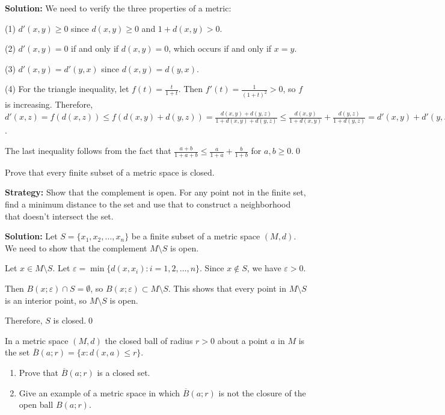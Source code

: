 \bigskip\noindent\textbf{Solution:} We need to verify the three properties of a metric:

(1) $d'(x,y) \geq 0$ since $d(x,y) \geq 0$ and $1 + d(x,y) > 0$.

(2) $d'(x,y) = 0$ if and only if $d(x,y) = 0$, which occurs if and only if $x = y$.

(3) $d'(x,y) = d'(y,x)$ since $d(x,y) = d(y,x)$.

(4) For the triangle inequality, let $f(t) = \frac{t}{1+t}$. Then $f'(t) = \frac{1}{(1+t)^2} > 0$, so $f$ is increasing. Therefore, $d'(x,z) = f(d(x,z)) \leq f(d(x,y) + d(y,z)) = \frac{d(x,y) + d(y,z)}{1 + d(x,y) + d(y,z)} \leq \frac{d(x,y)}{1 + d(x,y)} + \frac{d(y,z)}{1 + d(y,z)} = d'(x,y) + d'(y,z)$.

The last inequality follows from the fact that $\frac{a+b}{1+a+b} \leq \frac{a}{1+a} + \frac{b}{1+b}$ for $a,b \geq 0$.\qed


\begin{problembox}
Prove that every finite subset of a metric space is closed.
\end{problembox}

\noindent\textbf{Strategy:} Show that the complement is open. For any point not in the finite set, find a minimum distance to the set and use that to construct a neighborhood that doesn't intersect the set.

\bigskip\noindent\textbf{Solution:} Let $S = \{x_1, x_2, \ldots, x_n\}$ be a finite subset of a metric space $(M,d)$. We need to show that the complement $M \setminus S$ is open.

Let $x \in M \setminus S$. Let $\varepsilon = \min\{d(x,x_i) : i = 1,2,\ldots,n\}$. Since $x \notin S$, we have $\varepsilon > 0$.

Then $B(x;\varepsilon) \cap S = \emptyset$, so $B(x;\varepsilon) \subset M \setminus S$. This shows that every point in $M \setminus S$ is an interior point, so $M \setminus S$ is open.

Therefore, $S$ is closed.\qed


\begin{problembox}
In a metric space \((M, d)\) the closed ball of radius \( r > 0 \) about a point \( a \) in \( M \) is the set \( \overline{B}(a; r) = \{x : d(x, a) \leq r\} \).
\begin{enumerate}[label=\alph*)]
\item Prove that \( \overline{B}(a; r) \) is a closed set.
\item Give an example of a metric space in which \( \overline{B}(a; r) \) is not the closure of the open ball \( B(a; r) \).
\end{enumerate}
\end{problembox}

